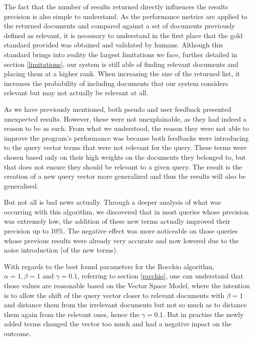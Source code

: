 \documentclass[12pt]{article}
\begin{document}
The fact that the number of results returned directly influences the results 
precision is also simple to understand.
As the performance metrics are applied to the returned documents and compared 
against a set of documents previously defined as relevant, it is necessary to 
understand in the first place that the gold standard provided was obtained and 
validated by humans. 
Although this standard brings into reality the largest limitations we face, further 
detailed in section \ref{limitations}, our system is still able of finding relevant 
documents and placing them at a higher rank. 
When increasing the size of the returned list, it increases the probability of 
including documents that our system considers relevant but may not actually be 
relevant at all.

As we have previously mentioned, both pseudo and user feedback presented 
unexpected results.
However, these were not unexplainable, as they had indeed a reason to be as such.
From what we understood, the reason they were not able to improve the program's
performance was because both feedbacks were introducing to the query vector 
terms that were not relevant for the query.
These terms were chosen based only on their high weights on the documents they
belonged to, but that does not ensure they should be relevant to a given query.
The result is the creation of a new query vector more generalized and thus the results
will also be generalised.

But not all is bad news actually.
Through a deeper analysis of what was occurring with this algorithm, we discovered 
that in most queries whose precision was extremely low, the addition of these new
terms actually improved their precision up to 10\%.
The negative effect was more noticeable on those queries whose previous results
were already very accurate and now lowered due to the noise introduction (of the new
terms).

With regards to the best found parameters for the Rocchio algorithm, 
$\alpha=1, \beta=1$ and $\gamma=0.1$, referring to section \ref{rocchio},
one can understand that those values are reasonable based on the Vector Space Model, 
where the intention is to allow the shift of the query vector closer to relevant 
documents with $\beta=1$ and distance them from the irrelevant documents but not 
so much as to distance them again from the relevant ones, hence the $\gamma=0.1$.
But in practise the newly added terms changed the vector too much and had a negative
inpact on the outcome.
\end{document}
